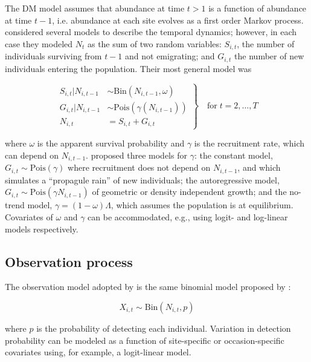 \documentclass[12pt,english]{article}
\begin{document}
\begin{spacing}{1.9}
\begin{flushleft}
The DM model assumes that abundance at time $t>1$ is a function of
abundance at time $t-1$, i.e. abundance at each site evolves as a
first order Markov process. 
\citet{dail_madsen:2011} considered several models to describe the temporal dynamics;
however, in each case they modeled $N_t$ as the sum of two random variables:
$S_{i,t}$, the number of individuals surviving from $t-1$ and not
emigrating; and $G_{i,t}$ the number of new individuals entering
the population. Their most general model was
\begin{linenomath*}
\begin{equation}
\left.\begin{aligned}
S_{i,t}|N_{i,t-1} &\sim \mathrm{Bin}(N_{i,t-1}, \omega) \\
G_{i,t}|N_{i,t-1} &\sim \mathrm{Pois}(\gamma(N_{i,t-1})) \\
N_{i,t} &= S_{i,t}+G_{i,t}
\end{aligned}\right\} \quad \text{for} \; t=2,\hdots,T
\label{eq:Nt}
\end{equation}
\end{linenomath*}
where $\omega$ is the apparent survival probability and $\gamma$
is the recruitment rate, which can depend on $N_{i,t-1}$.
\citet{dail_madsen:2011} proposed three
models for $\gamma$: the constant model,
$G_{i,t} \sim \mathrm{Pois}(\gamma)$ where recruitment does not
depend on $N_{i,t-1}$, and which simulates a ``propagule rain'' of new 
individuals; the autoregressive model, $G_{i,t} \sim
\mathrm{Pois}(\gamma N_{i,t-1})$
of geometric or density independent growth; and the
no-trend model, $\gamma = (1-\omega)\Lambda$, which assumes the
population is at equilibrium. Covariates of
$\omega$ and $\gamma$ can be accommodated, e.g., 
using logit- and log-linear models respectively.


\subsection*{Observation process}

The observation model adopted by \citet{dail_madsen:2011} is the same
binomial model proposed by \citet{royle:2004biom}: 
\begin{linenomath*}
\begin{equation}
  X_{i,t} \sim \mathrm{Bin}(N_{i,t}, p)
  \label{eq:p1}
\end{equation}
\end{linenomath*}
where $p$ is the probability of detecting each individual. Variation
in detection probability can be modeled as a function of site-specific
or occasion-specific covariates using, for example, a logit-linear model.


\end{flushleft}
\end{spacing}
\end{document}
